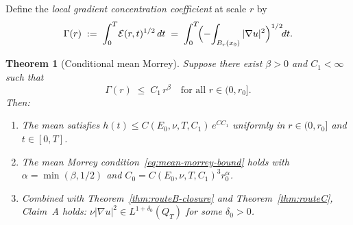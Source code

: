 \documentclass[11pt]{article}
\newtheorem{theorem}{Theorem}[section]
\theoremstyle{definition}
\theoremstyle{remark}
\newcommand{\Xint}{\mathop{\mathchoice{\vcenter{\hbox{$\displaystyle-$}}}%
  {\vcenter{\hbox{$\textstyle-$}}}%
  {\vcenter{\hbox{$\scriptstyle-$}}}%
  {\vcenter{\hbox{$\scriptscriptstyle-$}}}}\!\int}
\begin{document}
Define the \emph{local gradient concentration coefficient} at scale $r$ by
\begin{equation}\label{eq:Gamma-def}
  \Gamma(r) \;:=\; \int_0^T\!\mathcal{E}(r,t)^{1/2}\,dt
  \;=\; \int_0^T\!\Bigl(\Xint_{B_r(x_0)}|\nabla u|^2\Bigr)^{1/2}\!dt.
\end{equation}

\begin{theorem}[Conditional mean Morrey]
\label{thm:conditional-mean-morrey}
  Suppose there exist $\beta>0$ and $C_1<\infty$ such that
  \begin{equation}\label{eq:grad-concentration}
    \Gamma(r) \;\leq\; C_1\,r^\beta
    \quad\text{for all }r\in(0,r_0].
  \end{equation}
  Then:
  \begin{enumerate}
  \item[(a)] The mean satisfies $h(t)\leq C(E_0,\nu,T,C_1)\,e^{CC_1}$ uniformly in $r\in(0,r_0]$
    and $t\in[0,T]$.
  \item[(b)] The mean Morrey condition~\eqref{eq:mean-morrey-bound} holds with
    $\alpha=\min(\beta,1/2)$ and $C_0=C(E_0,\nu,T,C_1)^3 r_0^\alpha$.
  \item[(c)] Combined with Theorem~\ref{thm:routeB-closure} and
    Theorem~\ref{thm:routeC}, Claim~A holds: $\nu|\nabla u|^2\in L^{1+\delta_0}(Q_T)$
    for some $\delta_0>0$.
  \end{enumerate}
\end{theorem}
\end{document}
